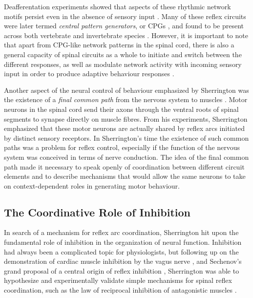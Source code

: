Deafferentation experiments showed that aspects of these rhythmic network motifs persist even in the absence of sensory input \cite{GrahamBrown1911}. Many of these reflex circuits were later termed \emph{central pattern generators}, or CPGs \cite{Grillner1975, Grillner1981}, and found to be present across both vertebrate and invertebrate species \cite{Orlovsky1999,Selverston2010}. However, it is important to note that apart from CPG-like network patterns in the spinal cord, there is also a general capacity of spinal circuits as a whole to initiate and switch between the different responses, as well as modulate network activity with incoming sensory input in order to produce adaptive behaviour responses \cite{Forssberg1975}.

Another aspect of the neural control of behaviour emphasized by Sherrington was the existence of a \emph{final common path} from the nervous system to muscles \cite{Sherrington1904}. Motor neurons in the spinal cord send their axons through the ventral roots of spinal segments to synapse directly on muscle fibres. From his experiments, Sherrington emphasized that these motor neurons are actually shared by reflex arcs initiated by distinct sensory receptors. In Sherrington's time the existence of such common paths was a problem for reflex control, especially if the function of the nervous system was conceived in terms of nerve conduction. The idea of the final common path made it necessary to speak openly of coordination between different circuit elements and to describe mechanisms that would allow the same neurons to take on context-dependent roles in generating motor behaviour.

\subsection{The Coordinative Role of Inhibition}

In search of a mechanism for reflex arc coordination, Sherrington hit upon the fundamental role of inhibition in the organization of neural function. Inhibition had always been a complicated topic for physiologists, but following up on the demonstration of cardiac muscle inhibition by the vagus nerve \cite{Weber1846}, and Sechenov's grand proposal of a central origin of reflex inhibition \cite{Sechenov1863}, Sherrington was able to hypothesize and experimentally validate simple mechanisms for spinal reflex coordination, such as the law of reciprocal inhibition of antagonistic muscles \cite{Sherrington1893b}.

